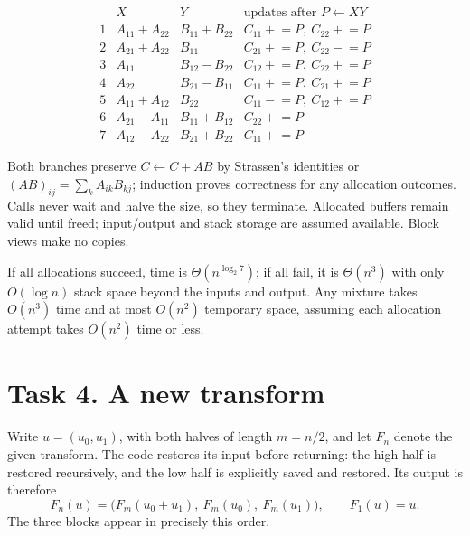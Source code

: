 \documentclass[11pt]{article}
\begin{document}
\[
\begin{array}{c|l|l|l}
 &X&Y&\text{updates after }P\leftarrow XY\\ \hline
1&A_{11}+A_{22}&B_{11}+B_{22}&C_{11}\mathrel{+}=P,\ C_{22}\mathrel{+}=P\\
2&A_{21}+A_{22}&B_{11}&C_{21}\mathrel{+}=P,\ C_{22}\mathrel{-}=P\\
3&A_{11}&B_{12}-B_{22}&C_{12}\mathrel{+}=P,\ C_{22}\mathrel{+}=P\\
4&A_{22}&B_{21}-B_{11}&C_{11}\mathrel{+}=P,\ C_{21}\mathrel{+}=P\\
5&A_{11}+A_{12}&B_{22}&C_{11}\mathrel{-}=P,\ C_{12}\mathrel{+}=P\\
6&A_{21}-A_{11}&B_{11}+B_{12}&C_{22}\mathrel{+}=P\\
7&A_{12}-A_{22}&B_{21}+B_{22}&C_{11}\mathrel{+}=P
\end{array}
\]

Both branches preserve $C\leftarrow C+AB$ by Strassen's identities or
$(AB)_{ij}=\sum_k A_{ik}B_{kj}$; induction proves correctness for any
allocation outcomes. Calls never wait and halve the size, so they terminate.
Allocated buffers remain valid until freed; input/output and stack storage
are assumed available. Block views make no copies.

If all allocations succeed, time is $\Theta(n^{\log_2 7})$; if all fail, it
is $\Theta(n^3)$ with only $O(\log n)$ stack space beyond the inputs and
output. Any mixture takes $O(n^3)$ time and at most $O(n^2)$ temporary space,
assuming each allocation attempt takes $O(n^2)$ time or less.

\newpage
\section*{Task 4. A new transform}

Write $u=(u_0,u_1)$, with both halves of length $m=n/2$, and let $F_n$
denote the given transform. The code restores its input before returning:
the high half is restored recursively, and the low half is explicitly saved
and restored. Its output is therefore
\[
 F_n(u)=\bigl(F_m(u_0+u_1),\ F_m(u_0),\ F_m(u_1)\bigr),
 \qquad F_1(u)=u.
\]
The three blocks appear in precisely this order.
\end{document}
